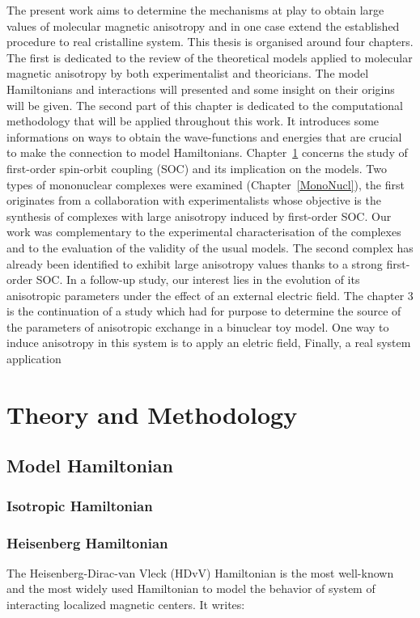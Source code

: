 \documentclass[12pt]{report}
\numberwithin{equation}{section}
\begin{document}
The present work aims to determine the mechanisms at play to obtain large values of molecular magnetic anisotropy and in one case extend the established procedure to real cristalline system.
This thesis is organised around four chapters. The first is dedicated to the review of the theoretical models applied to molecular magnetic anisotropy by both experimentalist and theoricians.
The model Hamiltonians and interactions will presented and some insight on their origins will be given.
The second part of this chapter is dedicated to the computational methodology that will be applied throughout this work.
It introduces some informations on ways to obtain the wave-functions and energies that are crucial to make the connection to model Hamiltonians.
Chapter~\ref{TheoryMethod} concerns the study of first-order spin-orbit coupling (SOC) and its implication on the models. 
Two types of mononuclear complexes were examined (Chapter~\ref{MonoNucl}), the first originates from a collaboration with experimentalists whose objective is the synthesis of complexes with large anisotropy induced by first-order SOC.
Our work was complementary to the experimental characterisation of the complexes and to the evaluation of the validity of the usual models.
The second complex has already been identified to exhibit large anisotropy values thanks to a strong first-order SOC.
In a follow-up study, our interest lies in the evolution of its anisotropic parameters under the effect of an external electric field.
The chapter 3 is the continuation of a study which had for purpose to determine the source of the parameters of anisotropic exchange in a binuclear toy model.
One way to induce anisotropy in this system is to apply an eletric field,
Finally, a real system application 



\chapter{Theory and Methodology}
\label{TheoryMethod}
\section{Model Hamiltonian}

\subsection{Isotropic Hamiltonian}

\subsection*{Heisenberg Hamiltonian}
The Heisenberg-Dirac-van Vleck (HDvV) Hamiltonian is the most well-known and the most widely used Hamiltonian to model the behavior of system of interacting localized magnetic centers\cite{s_theory_1932}.
It writes:
\end{document}

